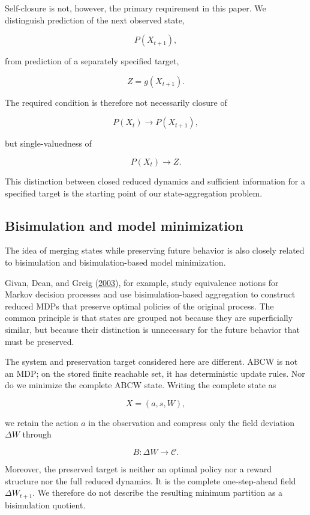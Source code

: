 \documentclass[
  11pt,
]{article}
\begin{document}
Self-closure is not, however, the primary requirement in this paper. We
distinguish prediction of the next observed state,

\[{P(X_{t+1}),}\]

from prediction of a separately specified target,

\[{Z=g(X_{t+1}).}\]

The required condition is therefore not necessarily closure of

\[{P(X_t)\longrightarrow P(X_{t+1}),}\]

but single-valuedness of

\[{P(X_t)\longrightarrow Z.}\]

This distinction between closed reduced dynamics and sufficient
information for a specified target is the starting point of our
state-aggregation problem.

\hypertarget{bisimulation-and-model-minimization}{%
\subsection{Bisimulation and model
minimization}\label{bisimulation-and-model-minimization}}

The idea of merging states while preserving future behavior is also
closely related to bisimulation and bisimulation-based model
minimization.

Givan, Dean, and Greig (\protect\hyperlink{ref-givan2003}{2003}), for
example, study equivalence notions for Markov decision processes and use
bisimulation-based aggregation to construct reduced MDPs that preserve
optimal policies of the original process. The common principle is that
states are grouped not because they are superficially similar, but
because their distinction is unnecessary for the future behavior that
must be preserved.

The system and preservation target considered here are different. ABCW
is not an MDP; on the stored finite reachable set, it has deterministic
update rules. Nor do we minimize the complete ABCW state. Writing the
complete state as

\[{X=(a,s,W),}\]

we retain the action \({a}\) in the observation and compress only the
field deviation \({\Delta W}\) through

\[{B:\Delta W\longrightarrow\mathcal C.}\]

Moreover, the preserved target is neither an optimal policy nor a reward
structure nor the full reduced dynamics. It is the complete
one-step-ahead field \({\Delta W_{t+1}}\). We therefore do not describe
the resulting minimum partition as a bisimulation quotient.
\end{document}
